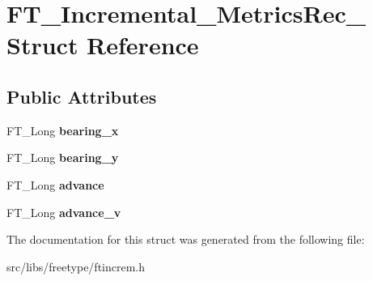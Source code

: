 \hypertarget{struct_f_t___incremental___metrics_rec__}{
\section{FT\_\-Incremental\_\-MetricsRec\_\- Struct Reference}
\label{struct_f_t___incremental___metrics_rec__}
}
\subsection*{Public Attributes}
\begin{DoxyCompactItemize}
\item 
\hypertarget{struct_f_t___incremental___metrics_rec___af065d998d0a0f2a57513125038d802a6}{
FT\_\-Long {\bfseries bearing\_\-x}}
\label{struct_f_t___incremental___metrics_rec___af065d998d0a0f2a57513125038d802a6}

\item 
\hypertarget{struct_f_t___incremental___metrics_rec___af1443aa7c1ca54d3c2a29f1cf6d7848b}{
FT\_\-Long {\bfseries bearing\_\-y}}
\label{struct_f_t___incremental___metrics_rec___af1443aa7c1ca54d3c2a29f1cf6d7848b}

\item 
\hypertarget{struct_f_t___incremental___metrics_rec___a996c99aa0e6b36c2c7776fc1a2b6b614}{
FT\_\-Long {\bfseries advance}}
\label{struct_f_t___incremental___metrics_rec___a996c99aa0e6b36c2c7776fc1a2b6b614}

\item 
\hypertarget{struct_f_t___incremental___metrics_rec___a0ee280662a03ea935dbfe377e56f4d6d}{
FT\_\-Long {\bfseries advance\_\-v}}
\label{struct_f_t___incremental___metrics_rec___a0ee280662a03ea935dbfe377e56f4d6d}

\end{DoxyCompactItemize}


The documentation for this struct was generated from the following file:\begin{DoxyCompactItemize}
\item 
src/libs/freetype/ftincrem.h\end{DoxyCompactItemize}
